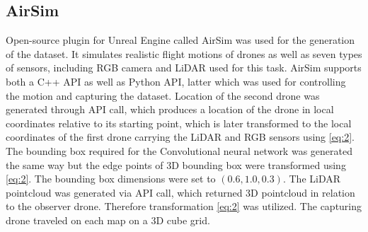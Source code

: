 \documentclass[twoside]{ctuthesis}
\theoremstyle{plain}
\theoremstyle{definition}
\theoremstyle{note}
\begin{document}
\subsection{AirSim}
Open-source plugin for Unreal Engine called AirSim was used for the generation of the dataset. It simulates realistic flight motions of drones as well as seven types of sensors, including RGB camera and LiDAR used for this task. AirSim supports both a C++ API as well as Python API, latter which was used for controlling the motion and capturing the dataset. Location of the second drone was generated through API call, which produces a location of the drone in local coordinates relative to its starting point, which is later transformed to the local coordinates of the first drone carrying the LiDAR and RGB sensors using \eqref{eq:2}. The bounding box required for the Convolutional neural network was generated the same way but the edge points of 3D bounding box were transformed using \eqref{eq:2}. The bounding box dimensions were set to $(0.6, 1.0, 0.3)$. The LiDAR pointcloud was generated via API call, which returned 3D pointcloud in relation to the observer drone. Therefore transformation \eqref{eq:2} was utilized. The capturing drone traveled on each map on a 3D cube grid.
\end{document}
